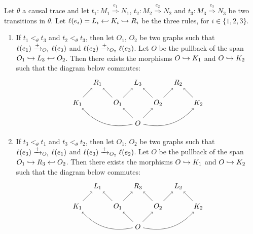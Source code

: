 \begin{lemma}
  \label{lem:constraint_mj}
  Let $\theta$ a causal trace and let $t_1:M_1\overset{e_1}{\Rightarrow}N_1$, $t_2:M_2\overset{e_2}{\Rightarrow}N_2$ and $t_3:M_3\overset{e_3}{\Rightarrow}N_3$ be two transitions in $\theta$. Let $\ell(e_i) = L_i\hookleftarrow K_i \hookrightarrow R_i$ be the three rules, for $i\in\{1,2,3\}$.
  \begin{enumerate}
  \item
    \label{lem:constraint_meet}
    If $t_1<_{\theta} t_3$ and $t_2<_{\theta} t_3$, then let $O_1$, $O_2$ be two graphs such that $\ell(e_1)\xrightarrow{+}_{O_1}\ell(e_3)$ and $\ell(e_2)\xrightarrow{+}_{O_2}\ell(e_3)$. Let $O$ be the pullback of the span $O_1\hookrightarrow L_3 \hookleftarrow O_2$. Then there exists the morphisms $O\hookrightarrow K_1$ and $O\hookrightarrow K_2$ such that the diagram below commutes:
    \[
    \begin{tikzpicture} %
      \node (o) at (0,-1) {\(O\)};
      \node (r3) at (0,1) {\(L_3\)};
      \node (o1) at (-1,0) {\(O_1\)};
      \node (o2) at (1,0) {\(O_2\)};
      \node (r1) at (-2,1) {\(R_1\)};
      \node (r2) at (2,1) {\(R_2\)};
      \node (k1) at (-3,0) {\(K_1\)};
      \node (k2) at (3,0) {\(K_2\)};
      \draw [->] (o) -- (o1);
      \draw [->] (o) -- (o2);
      \draw [->] (o1) -- (r3);
      \draw [->] (o2) -- (r3);
      \draw [->] (o1) -- (r1);
      \draw [->] (o2) -- (r2);
      \draw [->] (k1) -- (r1);
      \draw [->] (k2) -- (r2);
      \draw [->] (o) to [bend left] (k1);
      \draw [->] (o) to [bend right] (k2);
    \end{tikzpicture}
    \]
  \item
    \label{lem:constraint_join}
    If $t_3 <_{\theta} t_1$ and $t_3<_{\theta} t_2$, then let $O_1$, $O_2$ be two graphs such that $\ell(e_3)\xrightarrow{+}_{O_1}\ell(e_1)$ and $\ell(e_3)\xrightarrow{+}_{O_2}\ell(e_2)$. Let $O$ be the pullback of the span $O_1\hookrightarrow R_3 \hookleftarrow O_2$. Then there exists the morphisms $O\hookrightarrow K_1$ and $O\hookrightarrow K_2$ such that the diagram below commutes:
    \[
    \begin{tikzpicture} %
      \node (o) at (0,-1) {\(O\)};
      \node (r3) at (0,1) {\(R_3\)};
      \node (o1) at (-1,0) {\(O_1\)};
      \node (o2) at (1,0) {\(O_2\)};
      \node (r1) at (-2,1) {\(L_1\)};
      \node (r2) at (2,1) {\(L_2\)};
      \node (k1) at (-3,0) {\(K_1\)};
      \node (k2) at (3,0) {\(K_2\)};
      \draw [->] (o) -- (o1);
      \draw [->] (o) -- (o2);
      \draw [->] (o1) -- (r3);
      \draw [->] (o2) -- (r3);
      \draw [->] (o1) -- (r1);
      \draw [->] (o2) -- (r2);
      \draw [->] (k1) -- (r1);
      \draw [->] (k2) -- (r2);
      \draw [->] (o) to [bend left] (k1);
      \draw [->] (o) to [bend right] (k2);
    \end{tikzpicture}
    \]
  \end{enumerate}
\end{lemma}
